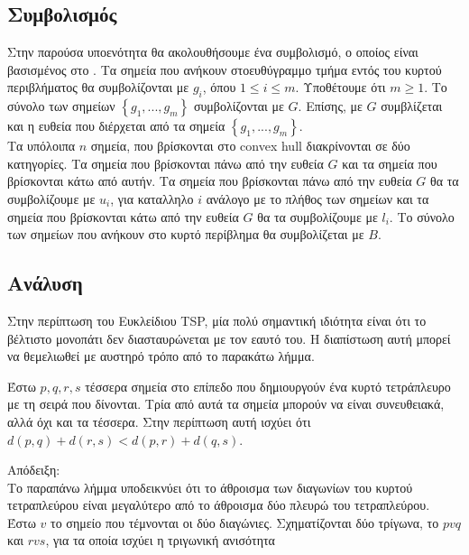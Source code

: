 \documentclass[oneside,12pt]{book}
\theoremstyle{definition}
\begin{document}
\subsection{Συμβολισμός}

Στην παρούσα υποενότητα θα ακολουθήσουμε ένα συμβολισμό, ο οποίος είναι βασισμένος στο \cite{17}. Τα σημεία που ανήκουν στοευθύγραμμο τμήμα εντός του κυρτού περιβλήματος θα συμβολίζονται με \(g_i\), όπου \(1 \leq i \leq m\). Υποθέτουμε ότι \(m \geq 1\). Το σύνολο των σημείων \(\left\{g_1,...,g_m\right\}\) συμβολίζονται με \(G\). Επίσης, με \(G\) συμβλίζεται και η ευθεία που διέρχεται από τα σημεία \(\left\{g_1,...,g_m\right\}\). \\

Τα υπόλοιπα \(n\) σημεία, που βρίσκονται στο convex hull διακρίνονται σε δύο κατηγορίες. Τα σημεία που βρίσκονται πάνω από την ευθεία \(G\) και τα σημεία που βρίσκονται κάτω από αυτήν. Τα σημεία που βρίσκονται πάνω από την ευθεία \(G\) θα τα συμβολίζουμε με \(u_i\), για καταλληλο \(i\) ανάλογο με το πλήθος των σημείων και τα σημεία που βρίσκονται κάτω από την ευθεία \(G\) θα τα συμβολίζουμε με \(l_i\). Το σύνολο των σημείων που ανήκουν στο κυρτό περίβλημα θα συμβολίζεται με \(B\). \\

\subsection{Ανάλυση}

Στην περίπτωση του Ευκλείδιου TSP, μία πολύ σημαντική ιδιότητα είναι ότι το βέλτιστο μονοπάτι δεν διασταυρώνεται με τον εαυτό του. Η διαπίστωση αυτή μπορεί να θεμελιωθεί με αυστηρό τρόπο από το παρακάτω λήμμα. \\

\begin{mylemma}{}{}
	Έστω \(p,q,r,s\) τέσσερα σημεία στο επίπεδο που δημιουργούν ένα κυρτό τετράπλευρο με τη σειρά που δίνονται. Τρία από αυτά τα σημεία μπορούν να είναι συνευθειακά, αλλά όχι και τα τέσσερα. Στην περίπτωση αυτή ισχύει ότι 
	\(d(p,q) + d(r,s) < d(p,r) + d(q,s)\).
\end{mylemma}

Απόδειξη: \\
Το παραπάνω λήμμα υποδεικνύει ότι το άθροισμα των διαγωνίων του κυρτού τετραπλεύρου είναι μεγαλύτερο από το άθροισμα δύο πλευρώ του τετραπλεύρου. \\
Έστω \(v\) το σημείο που τέμνονται οι δύο διαγώνιες. Σχηματίζονται δύο τρίγωνα, το \(pvq\) και \(rvs\), για τα οποία ισχύει η τριγωνική ανισότητα
\end{document}
